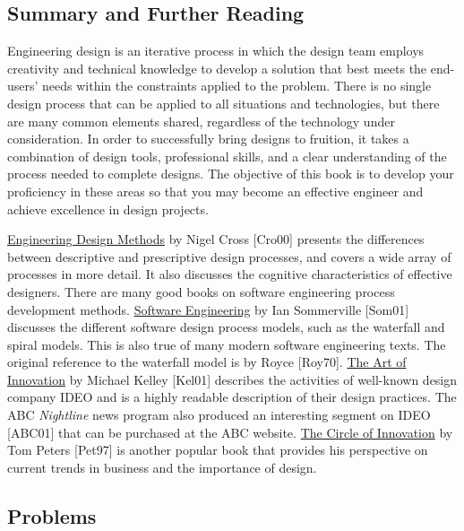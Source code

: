 \subsection{Summary and Further
Reading}\label{summary-and-further-reading}

Engineering design is an iterative process in which the design team
employs creativity and technical knowledge to develop a solution that
best meets the end-users' needs within the constraints applied to the
problem. There is no single design process that can be applied to all
situations and technologies, but there are many common elements shared,
regardless of the technology under consideration. In order to
successfully bring designs to fruition, it takes a combination of design
tools, professional skills, and a clear understanding of the process
needed to complete designs. The objective of this book is to develop
your proficiency in these areas so that you may become an effective
engineer and achieve excellence in design projects.

\ul{Engineering Design Methods} by Nigel Cross {[}Cro00{]} presents the
differences between descriptive and prescriptive design processes, and
covers a wide array of processes in more detail. It also discusses the
cognitive characteristics of effective designers. There are many good
books on software engineering process development methods. \ul{Software
Engineering} by Ian Sommerville {[}Som01{]} discusses the different
software design process models, such as the waterfall and spiral models.
This is also true of many modern software engineering texts. The
original reference to the waterfall model is by Royce {[}Roy70{]}.
\ul{The Art of Innovation} by Michael Kelley {[}Kel01{]} describes the
activities of well-known design company IDEO and is a highly readable
description of their design practices. The ABC \emph{Nightline} news
program also produced an interesting segment on IDEO {[}ABC01{]} that
can be purchased at the ABC website. \ul{The Circle of Innovation} by
Tom Peters {[}Pet97{]} is another popular book that provides his
perspective on current trends in business and the importance of design.

\subsection{Problems}\label{problems}

